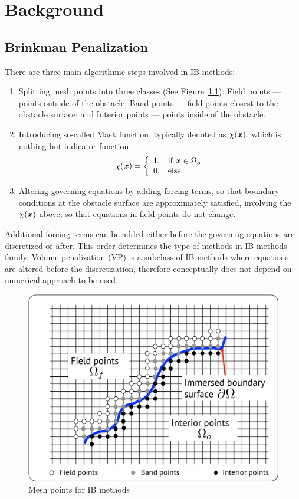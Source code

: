 \chapter{Background}
\label{chapter:2}


\section{Brinkman Penalization}
There are three main algorithmic steps involved in IB methods:
\begin{enumerate}
\item
Splitting mesh points into three classes (See Figure~\ref{fig:ib_mesh}): Field points --- points outside of the obstacle; Band points --- field points closest to the obstacle surface; and Interior points --- points inside of the obstacle.
\item
Introducing so-called Mask function, typically denoted as $\chi(\boldsymbol{x})$, which is nothing but indicator function
\begin{align*}
\chi(\boldsymbol{x}) = \left\{\begin{array}{cl}
1, & \textmd{if } \boldsymbol{x} \in \Omega_o \\
0, & \textmd{else.}
\end{array}\right.
\end{align*}
\item
Altering governing equations by adding forcing terms, so that boundary conditions at the obstacle surface are approximately satisfied, involving the $\chi(\boldsymbol{x})$ above, so that equations in field points do not change.
\end{enumerate}
Additional forcing terms can be added either before the governing equations are discretized or after. This order determines the type of methods in IB methods family. Volume penalization (VP) is a subclass of IB methods where equations are altered before the discretization, therefore conceptually does not depend on numerical approach to be used.

\begin{figure}[t!]
\centering \includegraphics[scale=0.5]{fig/ib.pdf}
\caption{Mesh points for IB methods} \label{fig:ib_mesh}
\end{figure}


